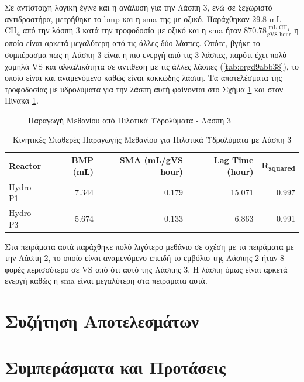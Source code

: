 \documentclass[11pt]{report}
\begin{document}
\begin{enumerate}
Σε αντίστοιχη λογική έγινε και η ανάλυση για την Λάσπη 3, ενώ σε ξεχωριστό αντιδραστήρα, μετρήθηκε το \acrshort{bmp} και η \acrshort{sma} της με οξικό. Παράχθηκαν 29.8 mL CH\textsubscript{4} από την λάσπη 3 κατά την τροφοδοσία με οξικό και η \acrshort{sma} ήταν \(870.78 \frac{\text{mL CH$_4$}}{\text{gVS hour}}\) η οποία είναι αρκετά μεγαλύτερη από τις άλλες δύο λάσπες. Οπότε, βγήκε το συμπέρασμα πως η Λάσπη 3 είναι η πιο ενεργή από τις 3 λάσπες, παρότι έχει πολύ χαμηλά VS και αλκαλικότητα σε αντίθεση με τις άλλες λάσπες (\ref{tab:orgd9abb38}), το οποίο είναι και αναμενόμενο καθώς είναι κοκκώδης λάσπη. Τα αποτελέσματα της τροφοδοσίας με υδρολύματα για την λάσπη αυτή φαίνονται στο Σχήμα \ref{fig:orge4f7479} και στον Πίνακα \ref{tab:org59d0e5f}.

\begin{figure}[htbp]
\centering

\caption{\label{fig:orge4f7479}Παραγωγή Μεθανίου από Πιλοτικά Υδρολύματα - Λάσπη 3}
\end{figure}

\begin{table}[htbp]
\caption{\label{tab:org59d0e5f}Κινητικές Σταθερές Παραγωγής Μεθανίου για Πιλοτικά Υδρολύματα με Λάσπη 3}
\centering
\begin{tabular}{lrrrr}
Reactor & BMP (mL) & SMA (mL/gVS hour) & Lag Time (hour) & R\textsubscript{squared}\\[0pt]
\hline
Hydro P1 & 7.344 & 0.179 & 15.071 & 0.997\\[0pt]
Hydro P3 & 5.674 & 0.133 & 6.863 & 0.991\\[0pt]
\end{tabular}
\end{table}

Στα πειράματα αυτά παράχθηκε πολύ λιγότερο μεθάνιο σε σχέση με τα πειράματα με την Λάσπη 2, το οποίο είναι αναμενόμενο επειδή το εμβόλιο της Λάσπης 2 ήταν 8 φορές περισσότερο σε VS από ότι αυτό της Λάσπης 3. Η λάσπη όμως είναι αρκετά ενεργή καθώς η \acrshort{sma} είναι μεγαλύτερη στα πειράματα αυτά.
\end{enumerate}

\chapter{Συζήτηση Αποτελεσμάτων}
\label{sec:org8917d74}
\label{sec:result_discussion}

\chapter{Συμπεράσματα και Προτάσεις}
\label{sec:orgbbde7f5}
\label{sec:conclusion}
\end{document}
